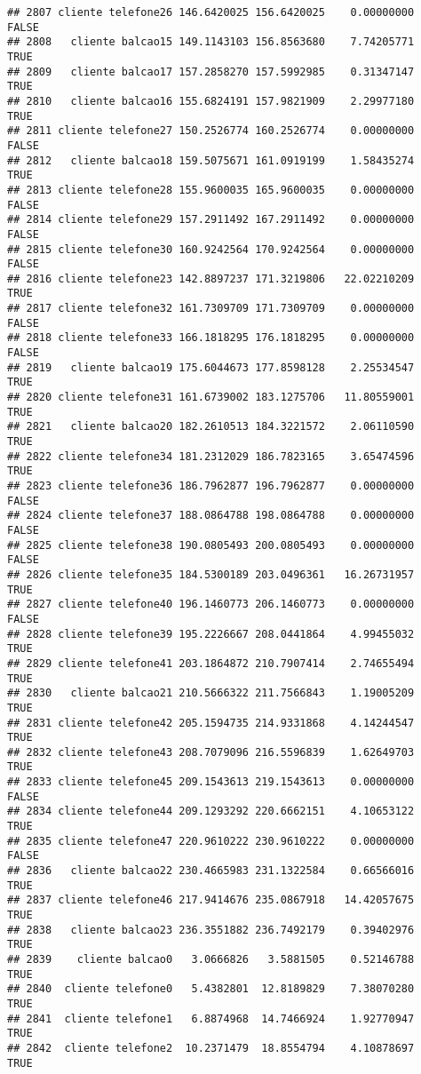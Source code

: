 \documentclass[
]{article}
\begin{document}
\begin{verbatim}
## 2807 cliente telefone26 146.6420025 156.6420025    0.00000000    FALSE
## 2808   cliente balcao15 149.1143103 156.8563680    7.74205771     TRUE
## 2809   cliente balcao17 157.2858270 157.5992985    0.31347147     TRUE
## 2810   cliente balcao16 155.6824191 157.9821909    2.29977180     TRUE
## 2811 cliente telefone27 150.2526774 160.2526774    0.00000000    FALSE
## 2812   cliente balcao18 159.5075671 161.0919199    1.58435274     TRUE
## 2813 cliente telefone28 155.9600035 165.9600035    0.00000000    FALSE
## 2814 cliente telefone29 157.2911492 167.2911492    0.00000000    FALSE
## 2815 cliente telefone30 160.9242564 170.9242564    0.00000000    FALSE
## 2816 cliente telefone23 142.8897237 171.3219806   22.02210209     TRUE
## 2817 cliente telefone32 161.7309709 171.7309709    0.00000000    FALSE
## 2818 cliente telefone33 166.1818295 176.1818295    0.00000000    FALSE
## 2819   cliente balcao19 175.6044673 177.8598128    2.25534547     TRUE
## 2820 cliente telefone31 161.6739002 183.1275706   11.80559001     TRUE
## 2821   cliente balcao20 182.2610513 184.3221572    2.06110590     TRUE
## 2822 cliente telefone34 181.2312029 186.7823165    3.65474596     TRUE
## 2823 cliente telefone36 186.7962877 196.7962877    0.00000000    FALSE
## 2824 cliente telefone37 188.0864788 198.0864788    0.00000000    FALSE
## 2825 cliente telefone38 190.0805493 200.0805493    0.00000000    FALSE
## 2826 cliente telefone35 184.5300189 203.0496361   16.26731957     TRUE
## 2827 cliente telefone40 196.1460773 206.1460773    0.00000000    FALSE
## 2828 cliente telefone39 195.2226667 208.0441864    4.99455032     TRUE
## 2829 cliente telefone41 203.1864872 210.7907414    2.74655494     TRUE
## 2830   cliente balcao21 210.5666322 211.7566843    1.19005209     TRUE
## 2831 cliente telefone42 205.1594735 214.9331868    4.14244547     TRUE
## 2832 cliente telefone43 208.7079096 216.5596839    1.62649703     TRUE
## 2833 cliente telefone45 209.1543613 219.1543613    0.00000000    FALSE
## 2834 cliente telefone44 209.1293292 220.6662151    4.10653122     TRUE
## 2835 cliente telefone47 220.9610222 230.9610222    0.00000000    FALSE
## 2836   cliente balcao22 230.4665983 231.1322584    0.66566016     TRUE
## 2837 cliente telefone46 217.9414676 235.0867918   14.42057675     TRUE
## 2838   cliente balcao23 236.3551882 236.7492179    0.39402976     TRUE
## 2839    cliente balcao0   3.0666826   3.5881505    0.52146788     TRUE
## 2840  cliente telefone0   5.4382801  12.8189829    7.38070280     TRUE
## 2841  cliente telefone1   6.8874968  14.7466924    1.92770947     TRUE
## 2842  cliente telefone2  10.2371479  18.8554794    4.10878697     TRUE

\end{verbatim}
\end{document}
